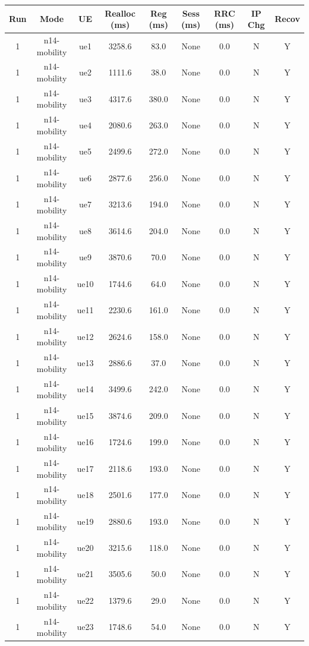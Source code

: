 \begin{table}[ht]
\centering
\begin{tabular}{|c|c|c|c|c|c|c|c|c|}
\hline
Run & Mode & UE & Realloc (ms) & Reg (ms) & Sess (ms) & RRC (ms) & IP Chg & Recov \\
\hline
1 & n14-mobility & ue1 & 3258.6 & 83.0 & None & 0.0 & N & Y \\
1 & n14-mobility & ue2 & 1111.6 & 38.0 & None & 0.0 & N & Y \\
1 & n14-mobility & ue3 & 4317.6 & 380.0 & None & 0.0 & N & Y \\
1 & n14-mobility & ue4 & 2080.6 & 263.0 & None & 0.0 & N & Y \\
1 & n14-mobility & ue5 & 2499.6 & 272.0 & None & 0.0 & N & Y \\
1 & n14-mobility & ue6 & 2877.6 & 256.0 & None & 0.0 & N & Y \\
1 & n14-mobility & ue7 & 3213.6 & 194.0 & None & 0.0 & N & Y \\
1 & n14-mobility & ue8 & 3614.6 & 204.0 & None & 0.0 & N & Y \\
1 & n14-mobility & ue9 & 3870.6 & 70.0 & None & 0.0 & N & Y \\
1 & n14-mobility & ue10 & 1744.6 & 64.0 & None & 0.0 & N & Y \\
1 & n14-mobility & ue11 & 2230.6 & 161.0 & None & 0.0 & N & Y \\
1 & n14-mobility & ue12 & 2624.6 & 158.0 & None & 0.0 & N & Y \\
1 & n14-mobility & ue13 & 2886.6 & 37.0 & None & 0.0 & N & Y \\
1 & n14-mobility & ue14 & 3499.6 & 242.0 & None & 0.0 & N & Y \\
1 & n14-mobility & ue15 & 3874.6 & 209.0 & None & 0.0 & N & Y \\
1 & n14-mobility & ue16 & 1724.6 & 199.0 & None & 0.0 & N & Y \\
1 & n14-mobility & ue17 & 2118.6 & 193.0 & None & 0.0 & N & Y \\
1 & n14-mobility & ue18 & 2501.6 & 177.0 & None & 0.0 & N & Y \\
1 & n14-mobility & ue19 & 2880.6 & 193.0 & None & 0.0 & N & Y \\
1 & n14-mobility & ue20 & 3215.6 & 118.0 & None & 0.0 & N & Y \\
1 & n14-mobility & ue21 & 3505.6 & 50.0 & None & 0.0 & N & Y \\
1 & n14-mobility & ue22 & 1379.6 & 29.0 & None & 0.0 & N & Y \\
1 & n14-mobility & ue23 & 1748.6 & 54.0 & None & 0.0 & N & Y \\

\end{tabular}
\end{table}

